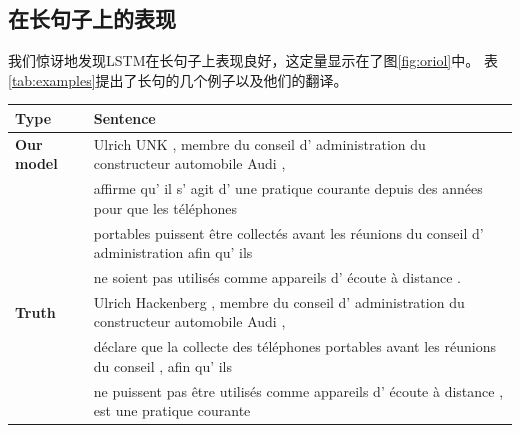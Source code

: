 \subsection{在长句子上的表现}
\label{sec:long_sentences}

我们惊讶地发现LSTM在长句子上表现良好，这定量显示在了图\ref{fig:oriol}中。
表\ref{tab:examples}提出了长句的几个例子以及他们的翻译。

\begin{table}[ht!]
\centering
\begin{footnotesize}
\begin{tabular}{|l|l|}
\hline
{\bf  Type} & {\bf Sentence} \\ 
\hline
\hline
{\bf Our model} & Ulrich UNK , membre du conseil d' administration du constructeur automobile Audi , \\
& affirme qu' il s' agit d' une pratique courante depuis des ann\'{e}es pour que les t\'{e}l\'{e}phones \\
& portables  puissent  \^{e}tre collect\'{e}s avant les r\'{e}unions du conseil d' administration afin qu' ils\\
&  ne soient pas  utilis\'{e}s comme appareils d' \'{e}coute \`{a} distance .\\
\hline
{\bf  Truth} &  Ulrich Hackenberg , membre du conseil d' administration du constructeur automobile Audi ,   \\
& d\'{e}clare que la collecte des t\'{e}l\'{e}phones portables avant les r\'{e}unions du conseil , afin qu' ils  \\
& ne puissent pas \^{e}tre utilis\'{e}s comme appareils d' \'{e}coute \`{a} distance , est une pratique courante \\ 

\end{tabular}
\end{footnotesize}
\end{table}
